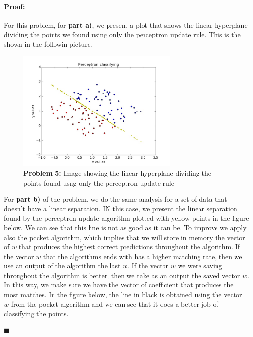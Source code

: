 \documentclass[12pt]{article}
\newenvironment{proof}{\paragraph{Proof: }}{\hfill$\blacksquare$}
\begin{document}
\begin{proof}
For this problem, for \textbf{part a)}, we present a plot that shows the linear hyperplane dividing the points we found using only the perceptron update rule. This is the shown in the followin picture.

\begin{figure}[!htbp]
\centering
\includegraphics[width=8cm]{hw2_p5_perceptron.jpg}
\caption{\textbf{Problem 5:} Image showing the linear hyperplane dividing the points found usng only the perceptron update rule}
\end{figure}

For \textbf{part b)} of the problem, we do the same analysis for a set of data that doesn't have a linear separation. IN this case, we present the linear separation found by the perceptron update algorithm plotted with yellow points in the figure below. We can see that this line is not as good as it can be. To improve we apply also the pocket algorithm, which implies that we will store in memory the vector of $w$ that produces the highest correct predictions throughout the algorithm. If the vector $w$ that the algorithms ends with has a higher matching rate, then we use an output of the algorithm the last $w$. If the vector $w$ we were saving throughout the algorithm is better, then we take as an output the saved vector $w$. In this way, we make sure we have the vector of coefficient that produces the most matches. In the figure below, the line in black is obtained using the vector $w$ from the pocket algorithm and we can see that it does a better job of classifying the points.


\end{proof}
\end{document}
